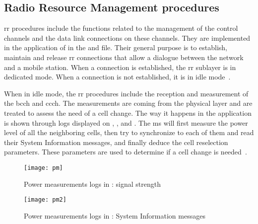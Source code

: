   \iffalse
  The procedures introduced in this section are placed in context in
  complete examples in \Sref{} and \Sref{}. They are also shown in
  \Sref{}, where the use of the \proj{OsmocomBB} applications is
  demonstrated. 
  \fi

  \subsection{Radio Resource Management procedures}
  \label{sec:rr_proc}

    \gls{rr} procedures include the functions related to the management
    of the control channels and the data link connections on these
    channels. They are implemented in the  application of
     in the  and
     file. Their general purpose is to establish,
    maintain and release \gls{rr} connections that allow a dialogue
    between the network and a mobile station. When a connection is
    established, the \gls{rr} sublayer is in dedicated mode. When a
    connection is not established, it is in idle
    mode~\cite{3gpp_ts_2015-2}.

    When in idle mode, the \gls{rr} procedures include the reception and
    measurement of the \gls{bcch} and \gls{ccch}. The measurements are
    coming from the physical layer and are treated to assess the need of
    a cell change. The way it happens in the  application
    is shown through logs displayed on , ,
    and . The \gls{ms} will first measure the power level
    of all the neighboring cells, then try to synchronize to each of
    them and read their System Information messages, and finally deduce
    the cell reselection parameters. These parameters are used to
    determine if a cell change is needed~\cite{3gpp_ts_2014-8}.

      \begin{figure}
        \centering
        \texttt{[image: pm]}
        \caption{Power measurements logs in : signal
        strength}
        \label{fig:pm}
      \end{figure}

      \begin{figure}
        \centering
        \texttt{[image: pm2]}
        \caption{Power measurements logs in : System
        Information messages}
        \label{fig:pm2}
      \end{figure}

